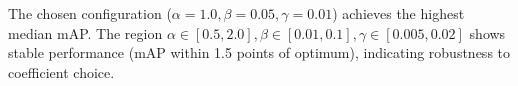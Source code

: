 \documentclass[10pt,twocolumn,letterpaper]{article}
\begin{document}
The chosen configuration ($\alpha=1.0, \beta=0.05, \gamma=0.01$) achieves the highest median mAP. The region $\alpha \in [0.5, 2.0], \beta \in [0.01, 0.1], \gamma \in [0.005, 0.02]$ shows stable performance (mAP within 1.5 points of optimum), indicating robustness to coefficient choice.



\end{document}
